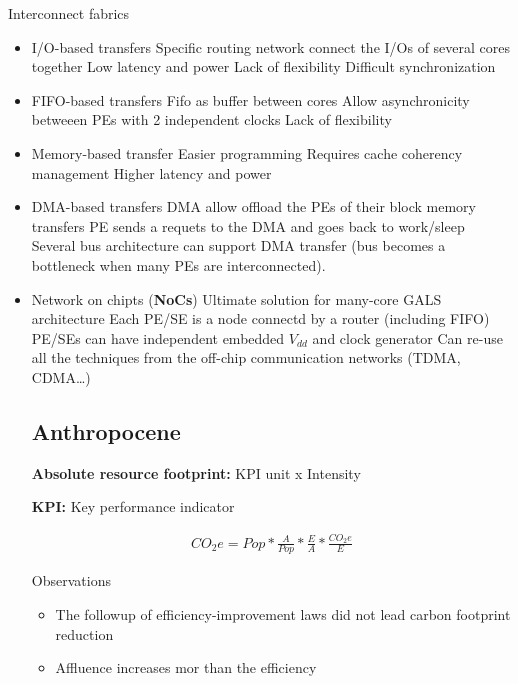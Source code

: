 \bigbreak
Interconnect fabrics
\begin{itemize}
  \item I/O-based transfers
    \subitem Specific routing network connect the I/Os of several cores together
    \subitem Low latency and power
    \subitem Lack of flexibility
    \subitem Difficult synchronization
  \item FIFO-based transfers
    \subitem Fifo as buffer between cores
    \subitem Allow asynchronicity betweeen PEs with 2 independent clocks
    \subitem Lack of flexibility
  \item Memory-based transfer
    \subitem Easier programming
    \subtiem Requires cache coherency management
    \subtiem Higher latency and power
  \item DMA-based transfers
    \subitem DMA allow offload the PEs of their block memory transfers
    \subtiem PE sends a requets to the DMA and goes back to work/sleep
    \subitem Several bus architecture can support DMA transfer (bus becomes a bottleneck when many PEs are interconnected).
  \item Network on chipts (\textbf{NoCs})
    \subtiem Ultimate solution for many-core GALS architecture
    \subitem Each PE/SE is a node connectd by a router (including FIFO)
    \subitem PE/SEs can have independent embedded \(V_{dd}\) and clock generator
    \subitem Can re-use all the techniques from the off-chip communication networks (TDMA, CDMA\dots)




\subsection{Anthropocene}

\textbf{Absolute resource footprint:} KPI unit x Intensity

\textbf{KPI:} Key performance indicator

\begin{align}
  CO_2e = Pop * \frac{A}{Pop} * \frac{E}{A} * \frac{CO_2e}{E}
\end{align}

\bigbreak
Observations
\begin{itemize}
  \item The followup of efficiency-improvement laws did not lead carbon footprint reduction
  \item Affluence increases mor than the efficiency
\end{itemize}


\end{itemize}
